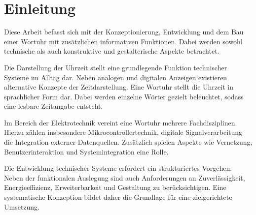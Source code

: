 \chapter{Einleitung}
Diese Arbeit befasst sich mit der Konzeptionierung, Entwicklung und dem Bau einer Wortuhr mit zusätzlichen informativen Funktionen. 
Dabei werden sowohl technische als auch konstruktive und gestalterische Aspekte betrachtet. 

Die Darstellung der Uhrzeit stellt eine grundlegende Funktion technischer Systeme im Alltag dar. 
Neben analogen und digitalen Anzeigen existieren alternative Konzepte der Zeitdarstellung. 
Eine Wortuhr stellt die Uhrzeit in sprachlicher Form dar. 
Dabei werden einzelne Wörter gezielt beleuchtet, sodass eine lesbare Zeitangabe entsteht. 

Im Bereich der Elektrotechnik vereint eine Wortuhr mehrere Fachdisziplinen. 
Hierzu zählen insbesondere Mikrocontrollertechnik, digitale Signalverarbeitung die Integration externer Datenquellen. 
Zusätzlich spielen Aspekte wie Vernetzung, Benutzerinteraktion und Systemintegration eine Rolle. 

Die Entwicklung technischer Systeme erfordert ein strukturiertes Vorgehen. 
Neben der funktionalen Auslegung sind auch Anforderungen an Zuverlässigkeit, Energieeffizienz, Erweiterbarkeit und Gestaltung zu berücksichtigen. 
Eine systematische Konzeption bildet daher die Grundlage für eine zielgerichtete Umsetzung. 